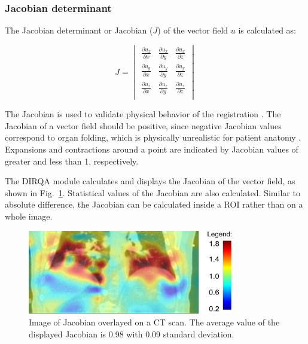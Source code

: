 \newpage
\subsubsection{Jacobian determinant}
\label{Jacobian}

The Jacobian determinant or Jacobian ($J$) of the vector field $u$ is calculated as:



\begin{equation}
J = \begin{vmatrix} 
\frac{\partial u_x}{\partial x} & \frac{\partial u_x}{\partial y} & \frac{\partial u_x}{\partial z} \\
\frac{\partial u_y}{\partial x} & \frac{\partial u_y}{\partial y} & \frac{\partial u_y}{\partial z} \\
\frac{\partial u_z}{\partial x} & \frac{\partial u_z}{\partial y} & \frac{\partial u_z}{\partial z} \\
\end{vmatrix}
\end{equation}

The Jacobian is used to validate physical behavior of the registration \cite{Leow2007}. 
The Jacobian of a vector field should be positive, since negative Jacobian values correspond to organ folding, 
which is physically unrealistic for patient anatomy \cite{ Rey2002, Chen2008}. 
Expansions and contractions around a point are indicated by Jacobian values of greater and less than 1, respectively.

The DIRQA module calculates and displays the Jacobian of the vector field, as shown in Fig.~\ref{JacobianImage}. Statistical values of the Jacobian are also calculated. Similar to absolute difference, the Jacobian can be calculated inside a ROI rather than on a whole image.

\begin{figure}[H]
	\begin{center}		
		\includegraphics[width=0.8\textwidth]{./Vmm/Images/jacobian.png}
		\caption{Image of Jacobian overlayed on a CT scan. The average value of the displayed Jacobian is 0.98 with 0.09 standard deviation.}
		\label{JacobianImage}
	\end{center}
\end{figure}

